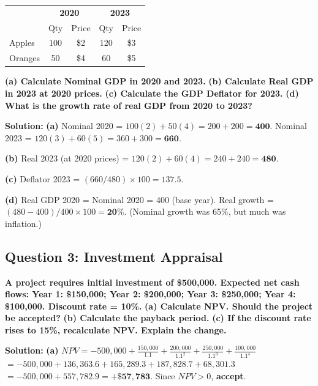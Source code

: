 \documentclass[10pt,a4paper]{article}
\begin{document}
\begin{multicols}{2}
\begin{center}
\begin{tabular}{@{}l|cc|cc@{}}
\toprule
& \multicolumn{2}{c|}{\textbf{2020}} & \multicolumn{2}{c}{\textbf{2023}} \\
& Qty & Price & Qty & Price \\
\midrule
Apples & 100 & \$2 & 120 & \$3 \\
Oranges & 50 & \$4 & 60 & \$5 \\
\bottomrule
\end{tabular}
\end{center}

\textbf{(a) Calculate Nominal GDP in 2020 and 2023.}
\textbf{(b) Calculate Real GDP in 2023 at 2020 prices.}
\textbf{(c) Calculate the GDP Deflator for 2023.}
\textbf{(d) What is the growth rate of real GDP from 2020 to 2023?}

\vspace{0.05cm}
\textbf{Solution:}
\vspace{0.05cm}
\textbf{(a)} Nominal 2020 = $100(2) + 50(4) = 200 + 200 = \mathbf{400}$. Nominal 2023 = $120(3) + 60(5) = 360 + 300 = \mathbf{660}$.

\textbf{(b)} Real 2023 (at 2020 prices) = $120(2) + 60(4) = 240 + 240 = \mathbf{480}$.

\textbf{(c)} Deflator 2023 = $(660/480) \times 100 = \mathbf{137.5}$.

\textbf{(d)} Real GDP 2020 = Nominal 2020 = 400 (base year). Real growth = $(480 - 400) / 400 \times 100 = \mathbf{20\%}$. (Nominal growth was 65\%, but much was inflation.)

\vspace{0.2cm}

\subsection*{Question 3: Investment Appraisal}
\textbf{A project requires initial investment of \$500,000. Expected net cash flows: Year 1: \$150,000; Year 2: \$200,000; Year 3: \$250,000; Year 4: \$100,000. Discount rate = 10\%.}
\textbf{(a) Calculate NPV. Should the project be accepted?}
\textbf{(b) Calculate the payback period.}
\textbf{(c) If the discount rate rises to 15\%, recalculate NPV. Explain the change.}

\vspace{0.05cm}
\textbf{Solution:}
\vspace{0.05cm}
\textbf{(a)} 
$NPV = -500,000 + \frac{150,000}{1.1} + \frac{200,000}{1.1^2} + \frac{250,000}{1.1^3} + \frac{100,000}{1.1^4}$
$= -500,000 + 136,363.6 + 165,289.3 + 187,828.7 + 68,301.3$
$= -500,000 + 557,782.9 = \mathbf{+\$57,783}$. Since $NPV > 0$, \textbf{accept}.


\end{multicols}
\end{document}
